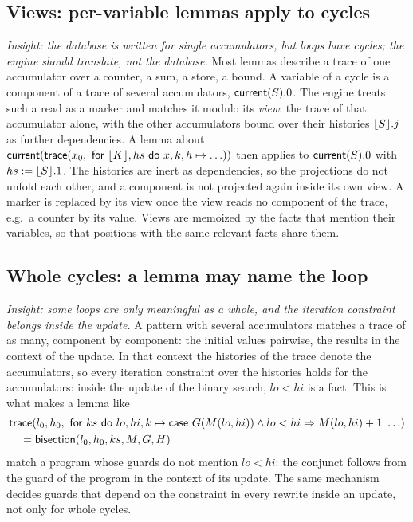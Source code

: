 \subsection{Views: per-variable lemmas apply to cycles}\label{sec:engine:views}
\emph{Insight: the database is written for single accumulators, but loops have cycles; the engine should
translate, not the database.} Most lemmas describe a trace of one accumulator over a counter, a sum, a store,
a bound. A variable of a cycle is a component of a trace of several accumulators, $\mathsf{current}(S).0$. The engine
treats such a read as a marker and matches it modulo its \emph{view}: the trace of that accumulator alone,
with the other accumulators bound over their histories $\lfloor S\rfloor.j$ as further dependencies. A lemma about
$\mathsf{current}(\mathsf{trace}(x_0,\ \mathsf{for}\ \lfloor K\rfloor, hs\ \mathsf{do}\ x, k, h \mapsto \ldots))$ then applies to $\mathsf{current}(S).0$ with $hs := \lfloor S\rfloor.1$. The
histories are inert as dependencies, so the projections do not unfold each other, and a component is not
projected again inside its own view. A marker is replaced by its view once the view reads no component of
the trace, e.g.\ a counter by its value. Views are memoized by the facts that mention their variables, so
that positions with the same relevant facts share them.

\subsection{Whole cycles: a lemma may name the loop}\label{sec:engine:cycles}
\emph{Insight: some loops are only meaningful as a whole, and the iteration constraint belongs inside the
update.} A pattern with several accumulators matches a trace of as many, component by component: the initial
values pairwise, the results in the context of the update. In that context the histories of the trace denote
the accumulators, so every iteration constraint over the histories holds for the accumulators: inside the
update of the binary search, $lo < hi$ is a fact. This is what makes a lemma like
\begin{align*}
  &\mathsf{trace}(l_0, h_0,\ \mathsf{for}\ ks\ \mathsf{do}\ lo, hi, k \mapsto
   \mathsf{case}\ G(M(lo, hi)) \wedge lo < hi \Rightarrow M(lo, hi) + 1\ \ldots)\\
  &\quad = \mathsf{bisection}(l_0, h_0, ks, M, G, H)
\end{align*}
match a program whose guards do not mention $lo < hi$: the conjunct follows from the guard of the program in
the context of its update. The same mechanism decides guards that depend on the constraint in every rewrite
inside an update, not only for whole cycles.

